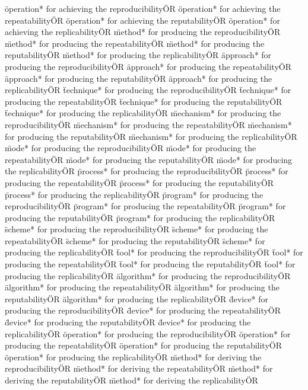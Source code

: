 \documentclass[
10pt, %
a4paper, %
oneside, %
headinclude,footinclude, %
BCOR5mm, %
]{scrartcl}
\begin{document}
\"operation* for achieving the reproducibility\" OR \"operation* for achieving the repeatability\" OR \"operation* for achieving the reputability\" OR \"operation* for achieving the replicability\" OR 
\"method* for producing the reproducibility\" OR \"method* for producing the repeatability\" OR \"method* for producing the reputability\" OR \"method* for producing the replicability\" OR 
\"approach* for producing the reproducibility\" OR \"approach* for producing the repeatability\" OR \"approach* for producing the reputability\" OR \"approach* for producing the replicability\" OR 
\"technique* for producing the reproducibility\" OR \"technique* for producing the repeatability\" OR \"technique* for producing the reputability\" OR \"technique* for producing the replicability\" OR 
\"mechanism* for producing the reproducibility\" OR \"mechanism* for producing the repeatability\" OR \"mechanism* for producing the reputability\" OR \"mechanism* for producing the replicability\" OR 
\"mode* for producing the reproducibility\" OR \"mode* for producing the repeatability\" OR \"mode* for producing the reputability\" OR \"mode* for producing the replicability\" OR 
\"process* for producing the reproducibility\" OR \"process* for producing the repeatability\" OR \"process* for producing the reputability\" OR \"process* for producing the replicability\" OR 
\"program* for producing the reproducibility\" OR \"program* for producing the repeatability\" OR \"program* for producing the reputability\" OR \"program* for producing the replicability\" OR 
\"scheme* for producing the reproducibility\" OR \"scheme* for producing the repeatability\" OR \"scheme* for producing the reputability\" OR \"scheme* for producing the replicability\" OR 
\"tool* for producing the reproducibility\" OR \"tool* for producing the repeatability\" OR \"tool* for producing the reputability\" OR \"tool* for producing the replicability\" OR 
\"algorithm* for producing the reproducibility\" OR \"algorithm* for producing the repeatability\" OR \"algorithm* for producing the reputability\" OR \"algorithm* for producing the replicability\" OR 
\"device* for producing the reproducibility\" OR \"device* for producing the repeatability\" OR \"device* for producing the reputability\" OR \"device* for producing the replicability\" OR 
\"operation* for producing the reproducibility\" OR \"operation* for producing the repeatability\" OR \"operation* for producing the reputability\" OR \"operation* for producing the replicability\" OR 
\"method* for deriving the reproducibility\" OR \"method* for deriving the repeatability\" OR \"method* for deriving the reputability\" OR \"method* for deriving the replicability\" OR 
\end{document}

